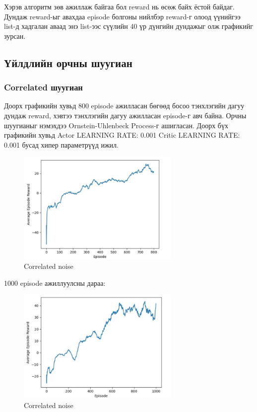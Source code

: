 \documentclass[12pt,A4]{report}
\begin{document}
Хэрэв алгоритм зөв ажиллаж байгаа бол reward нь өсөж байх ёстой байдаг. Дундаж reward-ыг авахдаа episode болгоны нийлбэр reward-г олоод үүнийгээ list-д хадгалан аваад энэ list-ээс сүүлийн 40 үр дүнгийн дундажыг олж графикийг зурсан.

\subsection{Үйлдлийн орчны шуугиан}

\subsubsection{Correlated шуугиан}

Доорх графикийн хувьд 800 episode ажилласан бөгөөд босоо тэнхлэгийн дагуу дундаж reward, хэвтээ тэнхлэгийн дагуу ажилласан episode-г авч байна. Орчны шуугианыг нэмэхдээ Ornstein-Uhlenbeck Process-г ашигласан. Доорх бүх графикийн хувьд Actor LEARNING RATE: 0.001 Critic LEARNING RATE: 0.001 бусад хипер параметрүүд ижил.

\begin{figure}[H]
\centering
\includegraphics[width=0.7\textwidth]{./images/after_800_ep}
\caption{Correlated noise}
\end{figure}

1000 episode ажиллуулсны дараа:

\begin{figure}[H]
\centering
\includegraphics[width=0.7\textwidth]{./images/after_1000_ep2}
\caption{Correlated noise}
\end{figure}
\end{document}
